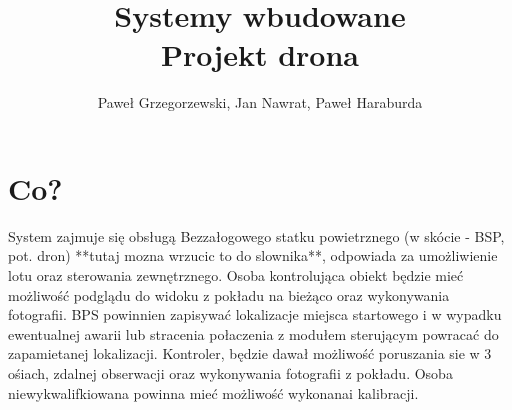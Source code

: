\documentclass[12pt]{article}
\title{Systemy wbudowane\\ Projekt drona}
\author{Paweł Grzegorzewski, Jan Nawrat, Paweł Haraburda}
\date{}
\begin{document}
\maketitle
\section{Co?}
System zajmuje się obsługą Bezzałogowego statku powietrznego (w skócie - BSP, pot. dron) **tutaj mozna wrzucic to do slownika**, odpowiada za umożliwienie lotu oraz sterowania zewnętrznego. Osoba kontrolująca obiekt będzie mieć możliwość podglądu do widoku z pokładu na bieżąco oraz wykonywania fotografii. BPS powinnien zapisywać lokalizacje miejsca startowego i w wypadku ewentualnej awarii lub stracenia połaczenia z modułem sterującym powracać do zapamietanej lokalizacji. Kontroler, będzie dawał możliwość poruszania sie w 3 ośiach, zdalnej obserwacji oraz wykonywania fotografii z pokładu. Osoba niewykwalifkiowana powinna mieć możliwość wykonanai kalibracji.
\end{document}
